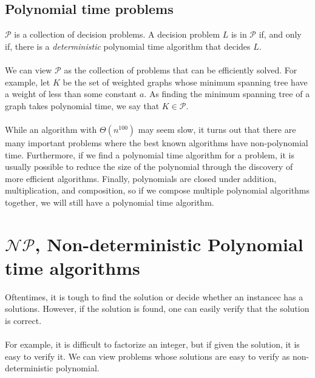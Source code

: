 \documentclass[a4paper]{article}
\begin{document}
\subsection{Polynomial time problems}
$\mathcal{P}$ is a collection of decision problems. A decision problem $L$ is in $\mathcal{P}$ if, and only if, there is a \textit{deterministic} polynomial time algorithm that decides $L$.\\\\
We can view $\mathcal{P}$ as the collection of problems that can be efficiently solved. For example, let $K$ be the set of weighted graphs whose minimum spanning tree have a weight of less than some constant $a$. As finding the minimum spanning tree of a graph takes polynomial time, we say that $K \in \mathcal{P}$.\\\\
While an algorithm with $\Theta(n^{100})$ may seem slow, it turns out that there are many important problems where the best known algorithms have non-polynomial time.
Furthermore, if we find a polynomial time algorithm for a problem, it is usually possible to reduce the size of the polynomial through the discovery of more efficient algorithms. Finally, polynomials are closed under addition, multiplication, and composition, so if we compose multiple polynomial algorithms together, we will still have a polynomial time algorithm.

\section{$\mathcal{NP}$, Non-deterministic Polynomial time algorithms}
Oftentimes, it is tough to find the solution or decide whether an instancec has a solutions. However, if the solution is found, one can easily verify that the solution is correct.\\\\
For example, it is difficult to factorize an integer, but if given the solution, it is easy to verify it. We can view problems whose solutions are easy to verify as non-deterministic polynomial.
\end{document}

